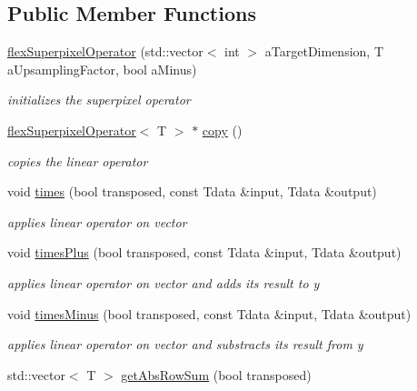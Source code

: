 \subsection*{Public Member Functions}
\begin{DoxyCompactItemize}
\item 
\hyperlink{classflex_superpixel_operator_a810ff259aed4c17eed5b6c731bb59b3b}{flex\+Superpixel\+Operator} (std\+::vector$<$ int $>$ a\+Target\+Dimension, T a\+Upsampling\+Factor, bool a\+Minus)
\begin{DoxyCompactList}\small\item\em initializes the superpixel operator \end{DoxyCompactList}\item 
\hyperlink{classflex_superpixel_operator}{flex\+Superpixel\+Operator}$<$ T $>$ $\ast$ \hyperlink{classflex_superpixel_operator_ab0e066735127a3b39958c6719fe03156}{copy} ()
\begin{DoxyCompactList}\small\item\em copies the linear operator \end{DoxyCompactList}\item 
void \hyperlink{classflex_superpixel_operator_afa075c0858c693342646250225f7c425}{times} (bool transposed, const Tdata \&input, Tdata \&output)
\begin{DoxyCompactList}\small\item\em applies linear operator on vector \end{DoxyCompactList}\item 
void \hyperlink{classflex_superpixel_operator_aa9c40f1e42786b6fe9cd698cf15028fc}{times\+Plus} (bool transposed, const Tdata \&input, Tdata \&output)
\begin{DoxyCompactList}\small\item\em applies linear operator on vector and adds its result to y \end{DoxyCompactList}\item 
void \hyperlink{classflex_superpixel_operator_af0831ae77a7e8c894a110146a316c944}{times\+Minus} (bool transposed, const Tdata \&input, Tdata \&output)
\begin{DoxyCompactList}\small\item\em applies linear operator on vector and substracts its result from y \end{DoxyCompactList}\item 
std\+::vector$<$ T $>$ \hyperlink{classflex_superpixel_operator_afd3f55401eaa6fb3e8a62c7f83443a4d}{get\+Abs\+Row\+Sum} (bool transposed)

\end{DoxyCompactItemize}
